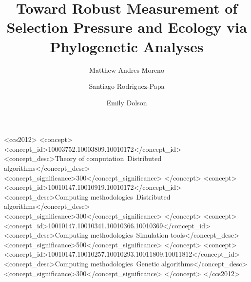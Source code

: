\documentclass[dvipsnames,format=sigconf,anonymous=true]{acmart}
\begin{document}
\title{Toward Robust Measurement of Selection Pressure and Ecology via Phylogenetic Analyses}

\author{Matthew Andres Moreno}

\author{Santiago Rodriguez-Papa}

\author{Emily Dolson}

\renewcommand{\shortauthors}{Moreno et al.}






\begin{CCSXML}
<ccs2012>
   <concept>
       <concept_id>10003752.10003809.10010172</concept_id>
       <concept_desc>Theory of computation~Distributed algorithms</concept_desc>
       <concept_significance>300</concept_significance>
       </concept>
   <concept>
       <concept_id>10010147.10010919.10010172</concept_id>
       <concept_desc>Computing methodologies~Distributed algorithms</concept_desc>
       <concept_significance>300</concept_significance>
       </concept>
   <concept>
       <concept_id>10010147.10010341.10010366.10010369</concept_id>
       <concept_desc>Computing methodologies~Simulation tools</concept_desc>
       <concept_significance>500</concept_significance>
       </concept>
   <concept>
       <concept_id>10010147.10010257.10010293.10011809.10011812</concept_id>
       <concept_desc>Computing methodologies~Genetic algorithms</concept_desc>
       <concept_significance>300</concept_significance>
       </concept>
 </ccs2012>
\end{CCSXML}
\end{document}
